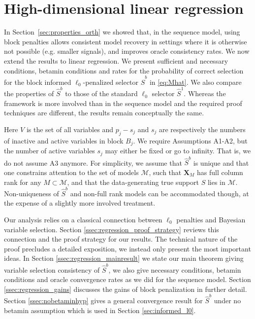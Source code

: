 \documentclass[aos]{imsart}
\theoremstyle{plain}
\newcommand{\M}{\mathcal{M}}
\newcommand{\bs}{\boldsymbol}
\begin{document}
\section{High-dimensional linear regression}
\label{sec:properties_legression}

In Section~\ref{sec:properties_orth} we showed that, in the sequence model, using block penalties allows consistent model recovery in settings where it is otherwise not possible (e.g. smaller signals), and improves oracle consistency rates. We now extend the results to linear regression. 
We present sufficient and necessary conditions, 
betamin conditions and rates for the probability of correct selection for the block informed $\ell_0$-penalized selector $\hat S^b$ in \eqref{eq:Mhat}. We also compare the properties of $\hat S^b$ to those of the standard $\ell_0$ selector $\hat S^1$. 
Whereas the framework is more involved than in the sequence model and the required proof techniques are different, the results remain conceptually the same. 

Here $V$ is the set of all variables and $p_j-s_j$ and $s_j$ are respectively the numbers of inactive and active variables in block $B_j$. We require Assumptions A1-A2, but the number of active variables $s_j$ may either be fixed or go to infinity. 
That is, we do not assume A3 anymore. For simplicity, we assume that $\hat{S}^b$ is unique and that one constrains attention to the set of models $\M$,
such that
$\bs X_M$ has full column rank for any $M \subset \M$, and that the data-generating true support $S$ lies in $\M$. Non-uniqueness of $\hat{S}^b$ and non-full rank models can be accommodated though, at the expense of a slightly more involved treatment.

Our analysis relies on a classical connection
between $\ell_0$ penalties and Bayesian variable selection. 
Section \ref{ssec:regression_proof_strategy} reviews this connection and the proof strategy for our results.
The technical nature of the proof precludes a detailed exposition, we instead only present the most important ideas.
In Section \ref{ssec:regression_mainresult} we state our main theorem
giving variable selection consistency of $\hat{S}^{b}$, we also give necessary conditions, betamin conditions and oracle convergence rates as we did for the sequence model. Section \ref{ssec:regression_gains} discusses the gains of block penalization in further detail. Section \ref{ssec:nobetaminhyp} gives a general convergence result for $\hat{S}^{b}$ under no betamin assumption which is used in Section \ref{sec:informed_l0}.
\end{document}
